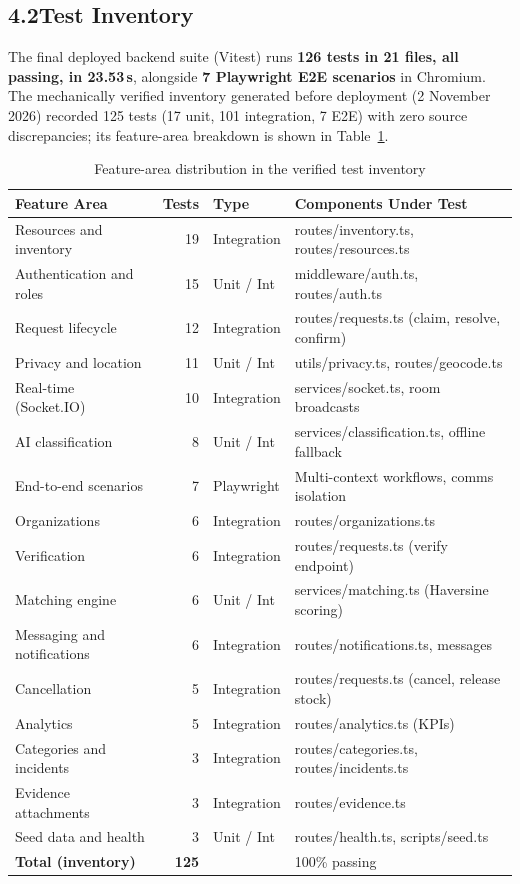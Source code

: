 \documentclass[11pt,a4paper]{article}
\begin{document}
\subsection{4.2\quad Test Inventory}\label{s42}

The final deployed backend suite (Vitest) runs \textbf{126 tests in 21 files, all passing, in 23.53\,s}, alongside \textbf{7 Playwright E2E scenarios} in Chromium. The mechanically verified inventory generated before deployment (2 November 2026) recorded 125 tests (17 unit, 101 integration, 7 E2E) with zero source discrepancies; its feature-area breakdown is shown in Table~\ref{tab:inventory}.

\renewcommand{\arraystretch}{1.1}
\begin{table}[H]
\centering
\footnotesize
\begin{tabularx}{\textwidth}{@{}Xrp{0.95in}X@{}}
\toprule
\textbf{Feature Area} & \textbf{Tests} & \textbf{Type} & \textbf{Components Under Test}\\
\midrule
Resources and inventory & 19 & Integration & routes/inventory.ts, routes/resources.ts\\
Authentication and roles & 15 & Unit / Int & middleware/auth.ts, routes/auth.ts\\
Request lifecycle & 12 & Integration & routes/requests.ts (claim, resolve, confirm)\\
Privacy and location & 11 & Unit / Int & utils/privacy.ts, routes/geocode.ts\\
Real-time (Socket.IO) & 10 & Integration & services/socket.ts, room broadcasts\\
AI classification & 8 & Unit / Int & services/classification.ts, offline fallback\\
End-to-end scenarios & 7 & Playwright & Multi-context workflows, comms isolation\\
Organizations & 6 & Integration & routes/organizations.ts\\
Verification & 6 & Integration & routes/requests.ts (verify endpoint)\\
Matching engine & 6 & Unit / Int & services/matching.ts (Haversine scoring)\\
Messaging and notifications & 6 & Integration & routes/notifications.ts, messages\\
Cancellation & 5 & Integration & routes/requests.ts (cancel, release stock)\\
Analytics & 5 & Integration & routes/analytics.ts (KPIs)\\
Categories and incidents & 3 & Integration & routes/categories.ts, routes/incidents.ts\\
Evidence attachments & 3 & Integration & routes/evidence.ts\\
Seed data and health & 3 & Unit / Int & routes/health.ts, scripts/seed.ts\\
\midrule
\textbf{Total (inventory)} & \textbf{125} & & 100\% passing\\
\bottomrule
\end{tabularx}
\caption{Feature-area distribution in the verified test inventory}\label{tab:inventory}
\end{table}
\renewcommand{\arraystretch}{1}
\end{document}
